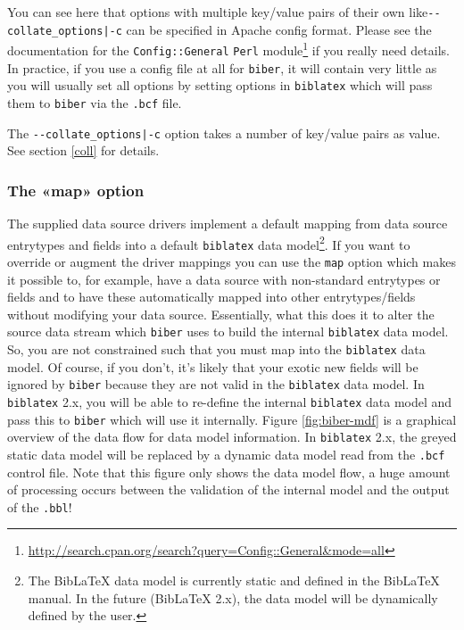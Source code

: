 \documentclass{ltxdockit}
\begin{document}
\noindent You can see here that options with multiple key/value pairs of
their own like\linebreak[4]\verb+--collate_options|-c+ can be specified in
Apache config format. Please see the documentation
for the \verb+Config::General+ \verb+Perl+
module\footnote{\url{http://search.cpan.org/search?query=Config::General&mode=all}}
if you really need details. In practice, if you use a config file at all
for \verb+biber+, it will contain very little as you will usually set all
options by setting options in \verb+biblatex+ which will pass them to
\verb+biber+ via the \verb+.bcf+ file.

The \verb+--collate_options|-c+ option takes a number of key/value pairs as
value. See section \ref{coll} for details.

\subsubsection{The «map» option}\label{map}

The supplied data source drivers implement a default mapping from
data source entrytypes and fields into a default \verb+biblatex+ data
model\footnote{The BibLaTeX data model is currently static and defined in
  the BibLaTeX manual. In the future (BibLaTeX 2.x), the data model will be dynamically
  defined by the user.}. If
you want to override or augment the driver mappings you can use the
\verb+map+ option which makes it possible to, for example, have a data
source with non-standard entrytypes or fields and to have these
automatically mapped into other entrytypes/fields without
modifying your data source. Essentially, what this does it to alter the
source data stream which \verb+biber+ uses to build the internal
\verb+biblatex+ data model. So, you are not constrained such that you must
map into the \verb+biblatex+ data model. Of course, if you don't, it's
likely that your exotic new fields will be ignored by \verb+biber+ because
they are not valid in the \verb+biblatex+ data model. In \verb+biblatex+
2.x, you will be able to re-define the internal \verb+biblatex+ data model
and pass this to \verb+biber+ which will use it internally. Figure
\ref{fig:biber-mdf} is a graphical overview of the data flow for data model
information. In \verb+biblatex+ 2.x, the greyed static data model will be
replaced by a dynamic data model read from the \verb+.bcf+ control file.
Note that this figure only shows the data model flow, a huge amount of
processing occurs between the validation of the internal model and the
output of the \verb+.bbl+!
\end{document}
